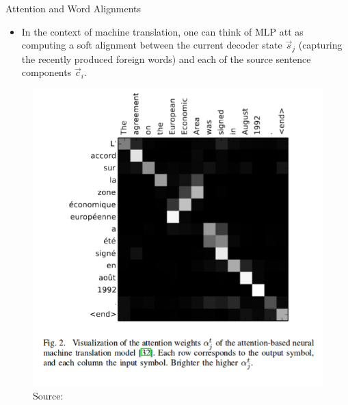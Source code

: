 \documentclass[handout]{beamer}
\begin{document}
\begin{frame}{Attention and Word Alignments}
\begin{scriptsize}
\begin{itemize}
\item In the context of machine translation, one can think of MLP att as computing a soft alignment between the current decoder state $\vec{s}_j$ (capturing the recently produced foreign words) and each of the source sentence components $\vec{c}_i$.


\end{itemize}


         \begin{figure}[h]
        	\includegraphics[scale = 0.28]{pics/attention-alignment.png}
        	\caption{Source: \cite{cho2015describing}}
        \end{figure}  


\end{scriptsize}
\end{frame}
\end{document}
